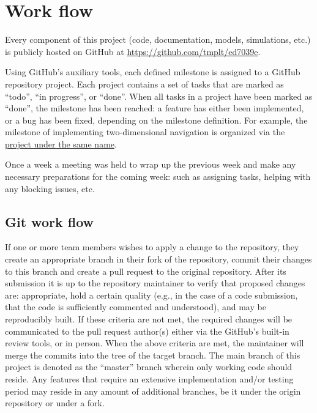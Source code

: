 \section{Work flow}
Every component of this project (code, documentation, models, simulations, etc.) is publicly hosted on GitHub at \href{https://github.com/tmplt/ed7039e}{https://github.com/tmplt/ed7039e}.

Using GitHub's auxiliary tools, each defined milestone is assigned to a GitHub repository project.
Each project contains a set of tasks that are marked as ``todo'', ``in progress'', or ``done''.
When all tasks in a project have been marked as ``done'', the milestone has been reached:
a feature has either been implemented, or a bug has been fixed, depending on the milestone definition.
For example, the milestone of implementing two-dimensional navigation is organized via the \href{https://github.com/tmplt/ed7039e/projects/1}{project under the same name}.

Once a week a meeting was held to wrap up the previous week and make any necessary preparations for the coming week:
such as assigning tasks, helping with any blocking issues, etc.

\subsection{Git work flow}
If one or more team members wishes to apply a change to the repository,
they create an appropriate branch in their fork of the repository,
commit their changes to this branch and create a pull request to the original repository.
After its submission it is up to the repository maintainer to verify that proposed changes are:
appropriate,
hold a certain quality (e.g., in the case of a code submission, that the code is sufficiently commented and understood),
and may be reproducibly built. %
If these criteria are not met, the required changes will be communicated to the pull request author(s) either via the GitHub's built-in review tools, or in person.
When the above criteria are met, the maintainer will merge the commits into the tree of the target branch.
The main branch of this project is denoted as the ``master'' branch wherein only working code should reside.
Any features that require an extensive implementation and/or testing period may reside in any amount of additional branches,
be it under the origin repository or under a fork.

